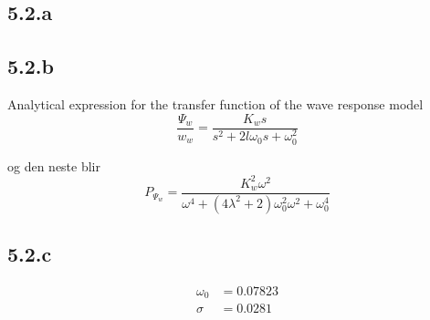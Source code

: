 \newcommand{\texMacro}[2]{\texttt{\textbackslash{#1}\{#2\}}}

\subsection{5.2.a}

\subsection{5.2.b}
Analytical expression for the transfer function of the wave response model
$$\frac{\Psi_w}{w_w} = \frac{K_ws}{s^2+2l\omega_0s+\omega_0^2}$$

og den neste blir
$$P_{\Psi_{w}} = \frac{K_w^2\omega^2}{\omega^4+(4\lambda^2+2)\omega_0^2\omega^2+\omega_0^4}$$

\subsection{5.2.c}

\begin{align*}
    \omega_0 &= 0.07823\\
    \sigma &= 0.0281
\end{align*}